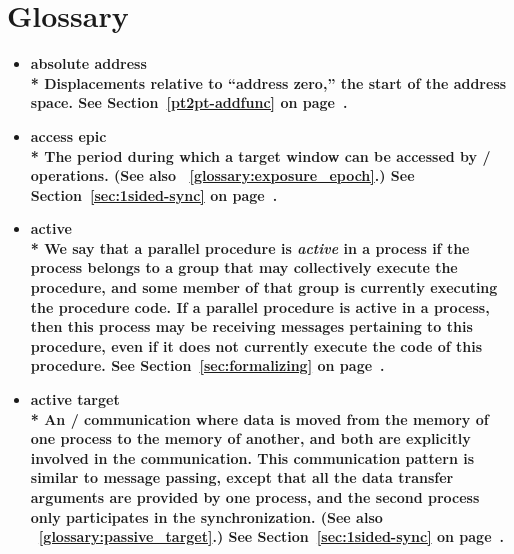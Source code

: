 %
%
%
%
%
%

\chapter{Glossary}
\label{glossary}
\begin{itemize}

\label{glossary:absolute_address}
\item \bf{ absolute address} \\*
Displacements relative to ``address
zero,'' the start of the address space.
See Section~\ref{pt2pt-addfunc} on page~\pageref{pt2pt-addfunc}.

\label{glossary:access_epic}
\item \bf{ access epic} \\*
The period during which a target window can be accessed by \RMA/
operations.
(See also ~\ref{glossary:exposure_epoch}.)
See Section~\ref{sec:1sided-sync} on page~\pageref{sec:1sided-sync}.

\label{glossary:active}
\item \bf{ active} \\* 
We say that a parallel procedure is {\em active} in a process if the process
belongs to a group that may collectively execute the procedure, and
some member of that group is currently executing the procedure code.
If a parallel procedure is active in a process, then this process may
be receiving messages pertaining to this procedure, even if it
does not currently execute the code of this procedure.
See Section~\ref{sec:formalizing} on page~\pageref{sec:formalizing}.

\label{glossary:active_target}
\item \bf{ active target} \\*
An \RMA/ communication where data is moved from the memory of one
process to the memory of another, and both are explicitly involved in the
communication.  This communication pattern is similar to message
passing, except that all the data transfer arguments are provided by
one process, and the second process only participates in the synchronization.
(See also ~\ref{glossary:passive_target}.)
See Section~\ref{sec:1sided-sync} on page~\pageref{sec:1sided-sync}.


\end{itemize}
